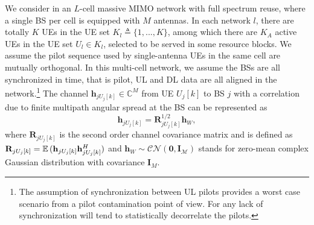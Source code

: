 We consider in an $L$-cell massive MIMO network with full spectrum reuse, where a single BS per cell is equipped 
with $M$ antennas. %
In each network $l$, there are totally $K$ UEs in the UE set $K_l\triangleq\{1,...,K\}$, among which there are $K_A$ active UEs in the UE set $U_l\in K_l$, selected to be served in some resource blocks. We assume the pilot sequence used by single-antenna UEs in the same
cell are mutually orthogonal. In this multi-cell network, we assume the BSs are all synchronized in time, that is pilot, UL and DL data are all aligned in the network.\footnote{The assumption of synchronization between UL pilots provides a worst
case scenario from a pilot contamination point of view. For any lack of
synchronization will tend to statistically decorrelate the pilots.} The channel $\mathbf{h}_{jU_j[k]}\in\mathbb{C}^{M}$ from UE $U_j[k]$ to BS $j$ with a correlation due to finite multipath angular spread at the BS  can be represented as
\begin{equation}
\mathbf{h}_{jU_{j}[k]}=\mathbf{R}_{jU_{j}[k]}^{1/2}\mathbf{h}_{W},
\end{equation}
where $\mathbf{R}_{jU_{j}[k]}$ is the second order channel covariance matrix and is defined as $\mathbf{R}_{jU_j[k]}=\operatorname{\mathbb{E}}{({\mathbf{h}}_{jU_j[k]}{\mathbf{h}}_{jU_j[k]}^H)}$ and $\mathbf{h}_{W}\sim \mathcal{CN\left(\mathbf{0},\mathbf{I}_M\right)}$ stands for zero-mean complex Gaussian distribution with covariance $\mathbf{I}_M$. 

